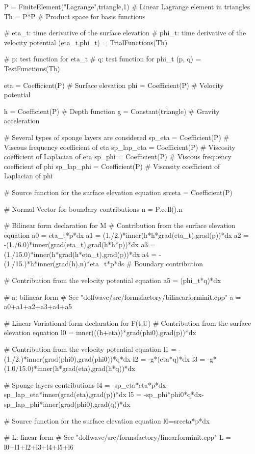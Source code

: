 \begin{python}
P = FiniteElement("Lagrange",triangle,1) # Linear Lagrange element in triangles
Th = P*P # Product space for basis functions

# eta_t: time derivative of the surface elevation
# phi_t: time derivative of the velocity potential
(eta_t,phi_t) = TrialFunctions(Th)

# p: test function for eta_t
# q: test function for phi_t
(p, q) = TestFunctions(Th)

eta = Coefficient(P) # Surface elevation
phi = Coefficient(P) # Velocity potential

h = Coefficient(P) # Depth function
g = Constant(triangle) # Gravity acceleration

# Several types of sponge layers are considered
sp_eta = Coefficient(P) # Viscous frequency coefficient of eta
sp_lap_eta = Coefficient(P) # Viscosity coefficient of Laplacian of eta
sp_phi = Coefficient(P) # Viscous frequency coefficient of phi
sp_lap_phi = Coefficient(P) # Viscosity coefficient of Laplacian of phi

# Source function for the surface elevation equation
srceta = Coefficient(P)

# Normal Vector for boundary contributions
n = P.cell().n

# Bilinear form declaration for M
# Contribution from the surface elevation equation
a0 = eta_t*p*dx
a1 = (1./2.)*inner(h*h*grad(eta_t),grad(p))*dx
a2 = -(1./6.0)*inner(grad(eta_t),grad(h*h*p))*dx
a3 = (1./15.0)*inner(h*grad(h*eta_t),grad(p))*dx
a4 = -(1./15.)*h*inner(grad(h),n)*eta_t*p*ds # Boundary contribution

# Contribution from the velocity potential equation
a5 = (phi_t*q)*dx

# a: bilinear form
# See "dolfwave/src/formsfactory/bilinearforminit.cpp"
a = a0+a1+a2+a3+a4+a5

# Linear Variational form declaration for F(t,U)
# Contribution from the surface elevation equation
l0 = inner(((h+eta))*grad(phi0),grad(p))*dx

# Contribution from the velocity potential equation
l1 = -(1./2.)*inner(grad(phi0),grad(phi0))*q*dx
l2 = -g*(eta*q)*dx
l3 = -g*(1.0/15.0)*inner(h*grad(eta),grad(h*q))*dx

# Sponge layers contributions
l4 = -sp_eta*eta*p*dx-sp_lap_eta*inner(grad(eta),grad(p))*dx
l5 = -sp_phi*phi0*q*dx-sp_lap_phi*inner(grad(phi0),grad(q))*dx

# Source function for the surface elevation equation
l6=srceta*p*dx

# L: linear form
# See "dolfwave/src/formsfactory/linearforminit.cpp"
L = l0+l1+l2+l3+l4+l5+l6
\end{python}

